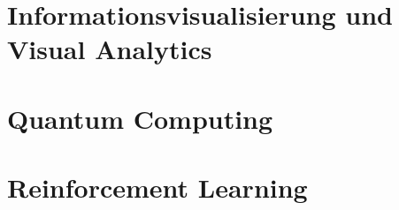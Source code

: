 \documentclass[english, notodo]{fdsummary}
\newcommand{\lstbasepath}{unset}
\begin{document}
	\cleardoublepage
	\part{Informationsvisualisierung und Visual Analytics}
	\graphicspath{{./cs/elective/vc/ivva/}}
	\renewcommand{\lstbasepath}{./cs/elective/vc/ivva}
	
	
	\cleardoublepage
	\part{Quantum Computing}
	\graphicspath{{./cs/elective/sf/qc/}}
	\renewcommand{\lstbasepath}{./cs/elective/sf/qc}
	
	
	\cleardoublepage
	\part{Reinforcement Learning}
	\graphicspath{{./cs/elective/ce/rl/}}
	\renewcommand{\lstbasepath}{./cs/elective/ce/rl}
	
\end{document}
